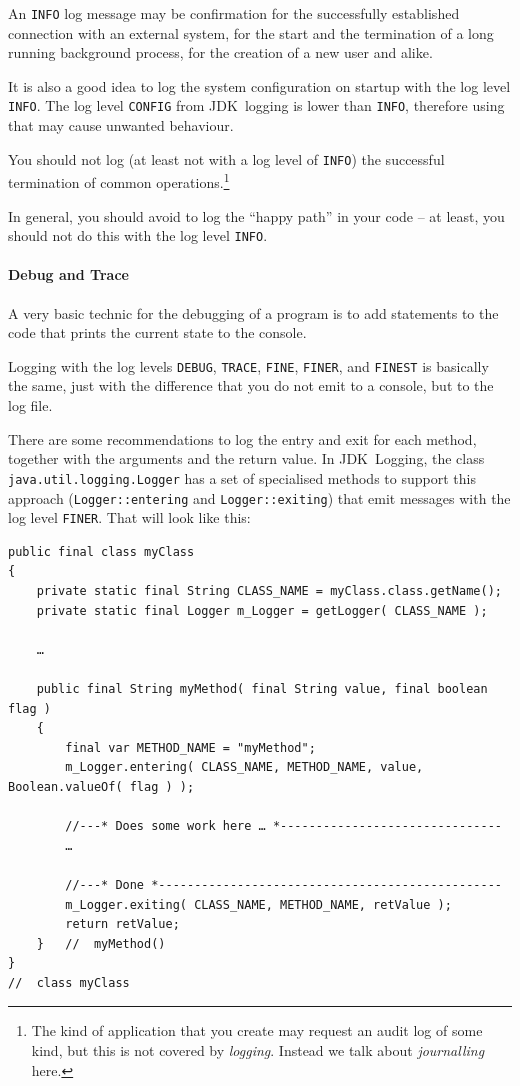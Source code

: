 An \verb#INFO# log message may be confirmation for the successfully established connection with an external system, for the start and the termination of a long running background process, for the creation of a new user and alike.

It is also a good idea to log the system configuration on startup with the log level \verb#INFO#. The log level \verb#CONFIG# from JDK~logging is lower than \verb#INFO#, therefore using that may cause unwanted behaviour. 

You should not log (at least not with a log level of \verb#INFO#) the successful termination of common operations.\footnote{The kind of application that you create may request an audit log of some kind, but this is not covered by \textit{logging}. Instead we talk about \textit{journalling} here.}

In general, you should avoid to log the “happy path” in your code – at least, you should not do this with the log level \verb#INFO#.

\paragraph{Debug and Trace} A very basic technic for the debugging of a program is to add statements to the code that prints the current state to the console.

Logging with the log levels \verb#DEBUG#, \verb#TRACE#, \verb#FINE#, \verb#FINER#, and \verb#FINEST# is basically the same, just with the difference that you do not emit to a console, but to the log file.

There are some recommendations to log the entry and exit for each method, together with the arguments and the return value. In JDK~Logging, the class \lstinline|java.util.logging.Logger| has a set of specialised methods to support this approach (\lstinline|Logger::entering| and \lstinline|Logger::exiting|) that emit messages with the log level \verb#FINER#. That will look like this:
\begin{lstlisting}
public final class myClass
{
    private static final String CLASS_NAME = myClass.class.getName();
    private static final Logger m_Logger = getLogger( CLASS_NAME );
    
	…    
    
    public final String myMethod( final String value, final boolean flag )
    {
        final var METHOD_NAME = "myMethod";
        m_Logger.entering( CLASS_NAME, METHOD_NAME, value, Boolean.valueOf( flag ) );
        
        //---* Does some work here … *-------------------------------
        …
    
        //---* Done *------------------------------------------------
        m_Logger.exiting( CLASS_NAME, METHOD_NAME, retValue );
        return retValue;
    }   //  myMethod()
}
//  class myClass
\end{lstlisting}

